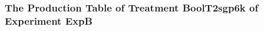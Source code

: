  \begin{frame}
 \fontsize{8pt}{9pt}\selectfont
 \frametitle{ The Production Table of Treatment BoolT2sgp6k of Experiment ExpB }

 \label{ExpBGrammarTable016.tex}  
 \end{frame}

